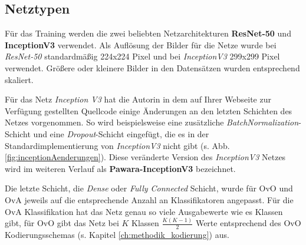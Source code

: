 \subsection{Netztypen}
\label{ch:methodik_netze}
Für das Training werden die zwei beliebten Netzarchitekturen \textbf{ResNet-50} und \textbf{InceptionV3} verwendet. Als Auflösung der Bilder für die Netze wurde bei \textit{ResNet-50} standardmäßig 224x224 Pixel und bei \textit{InceptionV3} 299x299 Pixel verwendet. Größere oder kleinere Bilder in den Datensätzen wurden entsprechend skaliert.

Für das Netz \textit{Inception V3} hat die Autorin in dem auf Ihrer Webseite zur Verfügung gestellten Quellcode \cite{pawaraWebsiteCode} einige Änderungen an den letzten Schichten des Netzes vorgenommen. So wird beispielsweise eine zusätzliche \textit{BatchNormalization}-Schicht und eine \textit{Dropout}-Schicht eingefügt, die es in der Standardimplementierung von \textit{InceptionV3} nicht gibt (s. Abb. \ref{fig:inceptionAenderungen}). Diese veränderte Version des \textit{InceptionV3} Netzes wird im weiteren Verlauf als \textbf{Pawara-InceptionV3} bezeichnet.

Die letzte Schicht, die \textit{Dense} oder \textit{Fully Connected} Schicht, wurde für OvO und OvA jeweils auf die entsprechende Anzahl an Klassifikatoren angepasst. Für die OvA Klassifikation hat das Netz genau so viele Ausgabewerte wie es Klassen gibt, für OvO gibt das Netz bei $K$ Klassen $\frac{K(K-1)}{2}$ Werte entsprechend des OvO Kodierungsschemas (s. Kapitel \ref{ch:methodik_kodierung}) aus.

